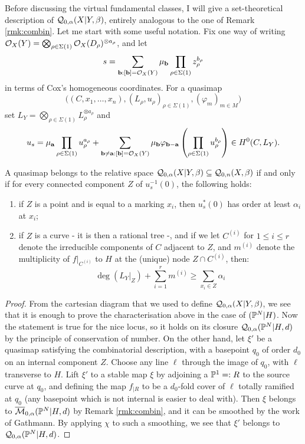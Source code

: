 Before discussing the virtual fundamental classes, I will give a set-theoretical description of $\mathcal{Q}_{0,\alpha}(X|Y,\beta)$, entirely analogous to the one of Remark \ref{rmk:combin}. Let me start with some useful notation. Fix one way of writing $\mathcal{O}_X(Y)=\bigotimes_{\rho\in\Sigma(1)}\mathcal{O}_X(D_\rho)^{\otimes a_\rho}$, and let
\[s=\sum_{\mathbf b:[\mathbf b]=\mathcal{O}_X(Y)}\mu_{\mathbf b}\prod_{\rho\in\Sigma(1)}z_\rho^{b_\rho}\]
in terms of Cox's homogeneous coordinates. For a quasimap 
\[ \Big((C,x_1,\ldots,x_n), (L_\rho,u_\rho)_{\rho \in \Sigma(1)}, (\varphi_m)_{m \in M}\Big) \]
set $L_Y=\bigotimes_{\rho\in\Sigma(1)}L_\rho^{\otimes a_\rho}$ and
\[u_s=\mu_{\mathbf a}\prod_{\rho\in\Sigma(1)}u_\rho^{a_\rho}+\sum_{\mathbf b\neq \mathbf a:[\mathbf b]=\mathcal{O}_X(Y)}\mu_{\mathbf b}\varphi_{\mathbf b-\mathbf a}\left(\prod_{\rho\in\Sigma(1)}u_\rho^{b_\rho}\right)\in H^0(C,L_Y).\]
\begin{lem} A quasimap belongs to the relative space $\mathcal{Q}_{0,\alpha}(X|Y,\beta)\subseteq \mathcal{Q}_{0,n}(X,\beta)$ if and only if for every connected component $Z$ of $u_s^{-1}(0)$, the following holds:
\begin{enumerate}
\item if $Z$ is a point and is equal to a marking $x_i$, then $u_s^*(0)$ has order at least $\alpha_i$ at $x_i$;
\item if $Z$ is a curve - it is then a rational tree -, and if we let $C^{(i)}$ for $1 \leq i \leq r$ denote the irreducible components of $C$ adjacent to $Z$, and $m^{(i)}$ denote the multiplicity of $f|_{C^{(i)}}$ to $H$ at the (unique) node $Z \cap C^{(i)}$, then:
\begin{equation} \label{Relative quasimap internal component inequality} \deg(L_{Y}|_Z) + \sum_{i=1}^r m^{(i)} \geq \sum_{x_i \in Z} \alpha_i \end{equation}
\end{enumerate}
\end{lem}
\begin{proof}
 From the cartesian diagram that we used to define $\mathcal{Q}_{0,\alpha}(X|Y,\beta)$, we see that it is enough to prove the characterisation above in the case of $(\mathbb P^N|H)$. Now the statement is true for the nice locus, so it holds on its closure $\mathcal{Q}_{0,\alpha}(\mathbb P^N|H,d)$ by the principle of conservation of number. On the other hand, let $\xi'$ be a quasimap satisfying the combinatorial description, with a basepoint $q_0$ of order $d_0$ on an internal component $Z$. Choose any line $\ell$ through the image of $q_0$, with $\ell$ transverse to $H$. Lift $\xi'$ to a stable map $\xi$ by adjoining a $\mathbb P^1=:R$ to the source curve at $q_0$, and defining the map $f_{|R}$ to be a $d_0$-fold cover of $\ell$ totally ramified at $q_0$ (any basepoint which is not internal is easier to deal with). Then $\xi$ belongs to $\overline{\mathcal{M}}_{0,\alpha}(\mathbb P^N|H,d)$ by Remark \ref{rmk:combin}, and it can be smoothed by the work of Gathmann. By applying $\chi$ to such a smoothing, we see that $\xi'$ belongs to $\mathcal{Q}_{0,\alpha}(\mathbb P^N|H,d)$.
\end{proof}

